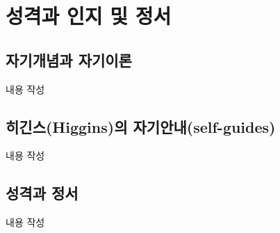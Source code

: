 \section{성격과 인지 및 정서}

\subsection{자기개념과 자기이론}
내용 작성

\subsection{히긴스(Higgins)의 자기안내(self-guides)}
내용 작성

\subsection{성격과 정서}
내용 작성
